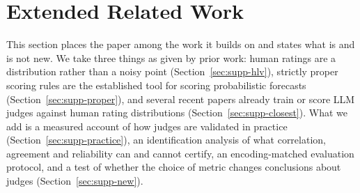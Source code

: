 
\section{Extended Related Work}
\label{sec:supp-related}

This section places the paper among the work it builds on and states what is and is not new.
We take three things as given by prior work: human ratings are a distribution rather than a noisy point (Section~\ref{sec:supp-hlv}), strictly proper scoring rules are the established tool for scoring probabilistic forecasts (Section~\ref{sec:supp-proper}), and several recent papers already train or score LLM judges against human rating distributions (Section~\ref{sec:supp-closest}).
What we add is a measured account of how judges are validated in practice (Section~\ref{sec:supp-practice}), an identification analysis of what correlation, agreement and reliability can and cannot certify, an encoding-matched evaluation protocol, and a test of whether the choice of metric changes conclusions about judges (Section~\ref{sec:supp-new}).

